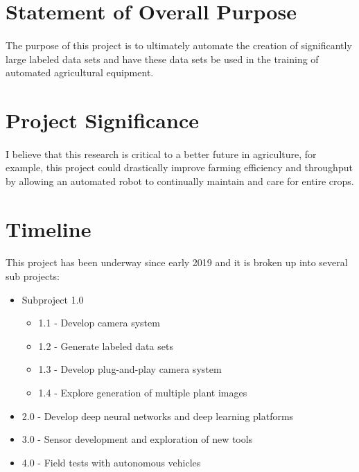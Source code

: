 \documentclass[12pt]{article}
\begin{document}
	\section{Statement of Overall Purpose}
		\paragraph{}
			The purpose of this project is to ultimately automate the creation of significantly large labeled data sets and have these data sets be used in the training of automated agricultural equipment.
	
	\section{Project Significance}
		\paragraph{}
			I believe that this research is critical to a better future in agriculture, for example, this project could drastically improve farming efficiency and throughput by allowing an automated robot to continually maintain and care for entire crops.
	\newpage
	\section{Timeline}
		\paragraph{}
			This project has been underway since early 2019 and it is broken up into several sub projects:
				\begin{itemize}
					\item Subproject 1.0
					\begin{itemize}
						\item 1.1 - Develop camera system
						\item 1.2 - Generate labeled data sets
						\item 1.3 - Develop plug-and-play camera system
						\item 1.4 - Explore generation of multiple plant images
					\end{itemize}
					\item 2.0 - Develop deep neural networks and deep learning platforms
					\item 3.0 - Sensor development and exploration of new tools
					\item 4.0 - Field tests with autonomous vehicles
				\end{itemize}
			
\end{document}
